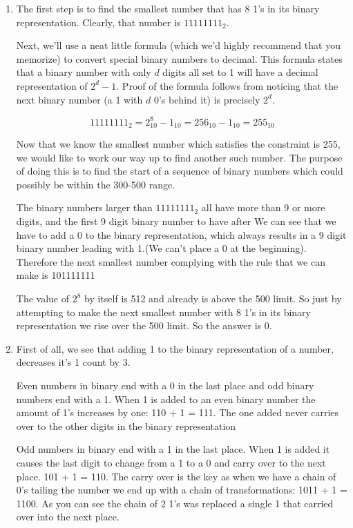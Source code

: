 \documentclass[12pt]{article}
\begin{document}
\begin{enumerate}

\item
The first step is to find the smallest number that has 8 1's in its binary representation. Clearly, that number is $11111111_2$. 

Next, we'll use a neat little formula (which we'd highly recommend that you memorize) to convert special binary numbers to decimal. This formula states that a binary number with only $d$ digits all set to 1 will have a decimal representation of $2^d-1$. Proof of the formula follows from noticing that the next binary number (a 1 with $d$ 0's behind it) is precisely $2^d$.

\[11111111_2 = 2^8_{10}-1_{10} = 256_{10}-1_{10} = 255_{10}\]

Now that we know the smallest number which satisfies the constraint is 255, we would like to work our way up to find another such number. The purpose of doing this is to find the start of a sequence of binary numbers which could possibly be within the 300-500 range.

The binary numbers larger than $11111111_2$ all have more than 9 or more digits, and the first 9 digit binary number to have after We can see that we have to add a 0 to the binary representation, which always results in a 9 digit binary number leading with 1.(We can't place a 0 at the beginning). Therefore the next smallest number complying with the rule that we can make is 101111111 

The value of $2^8$ by itself is 512 and already is above the 500 limit. So just by attempting to make the next smallest number with 8 1's in its binary representation we rise over the 500 limit. So the answer is 0.

\item
First of all, we see that adding 1 to the binary representation of a number, decreases it's 1 count by 3. 

Even numbers in binary end with a 0 in the last place and odd binary numbers end with a 1. When 1 is added to an even binary number the amount of 1's increases by one: 110 + 1 = 111. The one added never carries over to the other digits in the binary representation

Odd numbers in binary end with a 1 in the last place. When 1 is added it causes the last digit to change from a 1 to a 0 and carry over to the next place. 101 + 1 = 110. The carry over is the key as when we have a chain of 0's tailing the number we end up with a chain of transformations: 1011 + 1 = 1100. As you can see the chain of 2 1's was replaced a single 1 that carried over into the next place. 


\end{enumerate}
\end{document}
